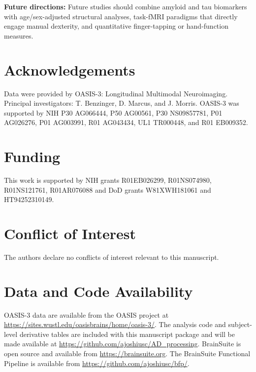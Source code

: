 \documentclass[review,3p,times,12pt,letterpaper]{elsarticle}
\begin{document}
\textbf{Future directions:} Future studies should combine amyloid and tau biomarkers with age/sex-adjusted structural analyses, task-fMRI paradigms that directly engage manual dexterity, and quantitative finger-tapping or hand-function measures.

\section*{Acknowledgements}

Data were provided by OASIS-3: Longitudinal Multimodal Neuroimaging. Principal investigators: T. Benzinger, D. Marcus, and J. Morris. OASIS-3 was supported by NIH P30 AG066444, P50 AG00561, P30 NS09857781, P01 AG026276, P01 AG003991, R01 AG043434, UL1 TR000448, and R01 EB009352.

\section*{Funding}

This work is supported by NIH grants R01EB026299, R01NS074980, R01NS121761, R01AR076088 and DoD grants W81XWH181061 and HT94252310149.

\section*{Conflict of Interest}

The authors declare no conflicts of interest relevant to this manuscript.

\section*{Data and Code Availability}

OASIS-3 data are available from the OASIS project at \url{https://sites.wustl.edu/oasisbrains/home/oasis-3/}. The analysis code and subject-level derivative tables are included with this manuscript package and will be made available at \url{https://github.com/ajoshiusc/AD_processing}. BrainSuite is open source and available from \url{https://brainsuite.org}. The BrainSuite Functional Pipeline is available from \url{https://github.com/ajoshiusc/bfp/}.



\end{document}
